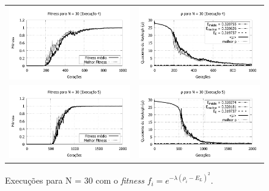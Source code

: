\begin{figure}[phtb]
\begin{tabular}{@{}cc@{}}
		\includegraphics[width=.40\textwidth]{figs/resultados/fitnessEL/N-30_E-4_fitness-extendido.pdf} &
    \includegraphics[width=.40\textwidth]{figs/resultados/fitnessEL/N-30_E-4_rho_extendido.pdf} \\
		\includegraphics[width=.40\textwidth]{figs/resultados/fitnessEL/N-30_E-5_fitness-extendido.pdf} &
    \includegraphics[width=.40\textwidth]{figs/resultados/fitnessEL/N-30_E-5_rho_extendido.pdf}
  \end{tabular}
  \caption{Execuções para N = 30 com o \textit{fitness} $f_i = e^{-\lambda(\rho_i - E_L)^2}$.}
	\label{fig:execucoes_N30_EL}
	\end{figure}
	
